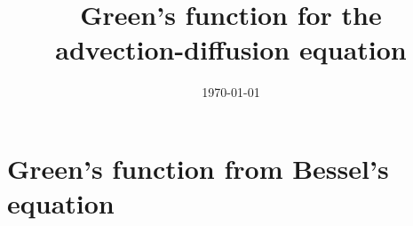 \documentclass[notitlepage,12pt]{article}
\newcommand{\mathnotation}[2]{\newcommand{#1}{\ensuremath{#2}}}
\begin{document}
\title{Green's function for the \\ advection-diffusion equation}


\date{\today}

\maketitle

\mathnotation{\xc}{x}
\mathnotation{\yc}{y}
\mathnotation{\rc}{r}
\mathnotation{\rv}{\bm{r}}
\mathnotation{\lapl}{\Delta}
\mathnotation{\kc}{k}
\mathnotation{\kv}{\bm{\kc}}
\mathnotation{\ac}{a}

\section{Green's function from Bessel's equation}
\end{document}
